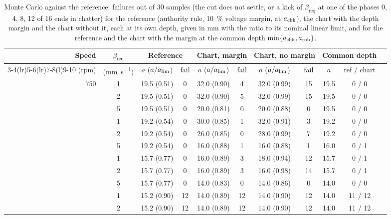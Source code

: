 \begin{table}[!htbp]
  \centering
  \caption{Monte Carlo against the reference: failures out of 30 samples (the cut does not settle, or a kick of $\beta_{\mathrm{req}}$ at one of the phases 0, 4, 8, 12 of 16 ends in chatter) for the reference (authority rule, \SI{10}{\percent} voltage margin, at $a_{\mathrm{chk}}$), the chart with the depth margin and the chart without it, each at its own depth, given in \si{\milli\metre} with the ratio to its nominal linear limit, and for the reference and the chart with the margin at the common depth $\min\{a_{\mathrm{chk}},a_{\mathrm{rob}}\}$.}
  \label{tab:ba-mc}
  \footnotesize
  \setlength{\tabcolsep}{3pt}
  \begin{tabular}{@{}rcccccccccc@{}}
    \toprule
    Speed & $\beta_{\mathrm{req}}$ & \multicolumn{2}{c}{Reference} & \multicolumn{2}{c}{Chart, margin} & \multicolumn{2}{c}{Chart, no margin} & \multicolumn{2}{c}{Common depth}\\
    \cmidrule(lr){3-4}\cmidrule(lr){5-6}\cmidrule(lr){7-8}\cmidrule(l){9-10}
    (rpm) & (\si{\milli\metre\per\second}) & $a$ ($a/a_{\lim}$) & fail & $a$ ($a/a_{\lim}$) & fail & $a$ ($a/a_{\lim}$) & fail & $a$ & ref / chart\\
    \midrule
    750 & 1 & 19.5 (0.51) & 0 & 32.0 (0.90) & 4 & 32.0 (0.99) & 15 & 19.5 & 0 / 0\\
     & 2 & 19.5 (0.51) & 0 & 32.0 (0.90) & 5 & 32.0 (0.99) & 15 & 19.5 & 0 / 0\\
     & 5 & 19.5 (0.51) & 0 & 20.0 (0.81) & 0 & 20.0 (0.88) & 0 & 19.5 & 0 / 0\\
    \addlinespace
    1125 & 1 & 19.2 (0.54) & 0 & 30.0 (0.85) & 1 & 32.0 (0.91) & 3 & 19.2 & 0 / 0\\
     & 2 & 19.2 (0.54) & 0 & 26.0 (0.85) & 0 & 28.0 (0.99) & 7 & 19.2 & 0 / 0\\
     & 5 & 19.2 (0.54) & 0 & 16.0 (0.88) & 1 & 16.0 (0.88) & 1 & 16.0 & 0 / 1\\
    \addlinespace
    1375 & 1 & 15.7 (0.77) & 0 & 16.0 (0.89) & 3 & 18.0 (0.94) & 12 & 15.7 & 0 / 1\\
     & 2 & 15.7 (0.77) & 0 & 16.0 (0.89) & 3 & 16.0 (0.98) & 14 & 15.7 & 0 / 1\\
     & 5 & 15.7 (0.77) & 0 & 14.0 (0.83) & 0 & 14.0 (0.86) & 0 & 14.0 & 0 / 0\\
    \addlinespace
    2000 & 1 & 15.2 (0.90) & 12 & 14.0 (0.89) & 12 & 14.0 (0.90) & 12 & 14.0 & 11 / 12\\
     & 2 & 15.2 (0.90) & 12 & 14.0 (0.89) & 12 & 14.0 (0.90) & 12 & 14.0 & 11 / 12\\

\end{tabular}
\end{table}
